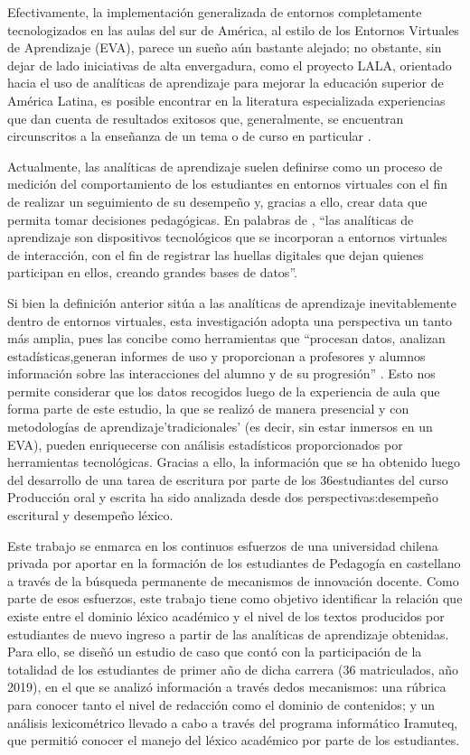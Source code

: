 \documentclass{textolivre}
\begin{document}
Efectivamente, la implementación generalizada de entornos
completamente tecnologizados en las aulas del sur de América, al estilo de los
Entornos Virtuales de Aprendizaje (EVA), parece un sueño aún bastante alejado;
no obstante, sin dejar de lado iniciativas de alta envergadura, como el proyecto
LALA, orientado hacia el uso de analíticas de aprendizaje para mejorar la
educación superior de América Latina, es posible encontrar en la literatura
especializada experiencias que dan cuenta de resultados exitosos que,
generalmente, se encuentran circunscritos a la enseñanza de un tema o de curso
en particular \cite[por ejemplo]{ninoCarrasco2019}.

Actualmente, las analíticas de aprendizaje suelen definirse como un proceso
de medición del comportamiento de los estudiantes en entornos virtuales con el
fin de realizar un seguimiento de su desempeño y, gracias a ello, crear data que
permita tomar decisiones pedagógicas. En palabras de \textcite{Sabulsky2019},
“las analíticas de aprendizaje son dispositivos tecnológicos que se incorporan a
entornos virtuales de interacción, con el fin de registrar las huellas digitales
que dejan quienes participan en ellos, creando grandes bases de datos”.

Si bien la definición anterior sitúa a las analíticas de aprendizaje
inevitablemente
dentro de entornos virtuales, esta investigación adopta una
perspectiva un tanto más amplia, pues las concibe como herramientas que
“procesan datos, analizan estadísticas,generan informes de uso y
proporcionan a profesores y alumnos información sobre
las interacciones del alumno y de su progresión” \cite[p. 185]{conole}. Esto
nos permite considerar que los datos recogidos luego de la experiencia de aula
que forma parte de este estudio, la que se realizó de manera presencial y con
metodologías de aprendizaje'tradicionales' (es decir, sin estar inmersos en un
EVA), pueden enriquecerse con análisis estadísticos proporcionados por
herramientas tecnológicas. Gracias a ello, la información que se ha
obtenido luego del desarrollo de una tarea de escritura por
parte de los 36estudiantes del curso Producción oral y escrita ha sido
analizada desde dos perspectivas:desempeño escritural y desempeño léxico.

Este trabajo se enmarca en los continuos esfuerzos de una universidad
chilena privada por aportar en la formación de los estudiantes de Pedagogía en
castellano a través de la búsqueda permanente de mecanismos de innovación
docente. Como parte de esos esfuerzos, este trabajo tiene como objetivo
identificar la relación que existe entre el dominio léxico académico y el nivel
de los textos producidos por estudiantes de nuevo ingreso a partir de las
analíticas de aprendizaje obtenidas. Para ello, se diseñó un estudio de caso que
contó con la participación de la totalidad de los estudiantes de primer año
de dicha carrera (36 matriculados, año 2019), en el que se analizó información a
través dedos mecanismos: una rúbrica para conocer tanto el nivel de redacción
como el dominio de contenidos; y un análisis lexicométrico llevado a cabo a
través del programa informático Iramuteq, que permitió conocer el manejo del
léxico académico por parte de los estudiantes.
\end{document}
